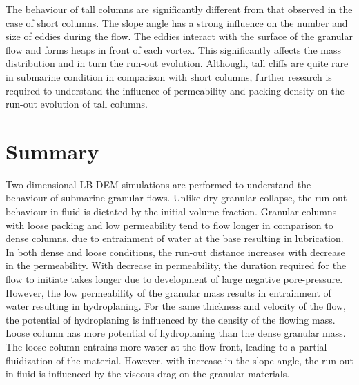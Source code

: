 The behaviour of tall columns are significantly different from that observed in 
the case of short columns. The slope angle has a strong influence on the number 
and size of eddies during the flow. The eddies interact with the surface of the 
granular flow and forms heaps in front of each vortex. This significantly 
affects the mass distribution and in turn the run-out evolution. Although, tall 
cliffs are quite rare in submarine condition in comparison with short columns, 
further research is required to understand the influence of permeability and 
packing density on the run-out evolution of tall columns. 

\section{Summary}

Two-dimensional LB-DEM simulations are performed to understand the behaviour 
of submarine granular flows. Unlike dry granular collapse, the run-out 
behaviour in fluid is dictated by the initial volume fraction. Granular columns 
with loose packing and low permeability tend to flow longer in comparison to 
dense columns, due to entrainment of water at the base resulting in 
lubrication. In both dense and loose conditions, the run-out distance increases 
with decrease in the permeability. With decrease in permeability, the duration 
required for the flow to initiate takes longer due to development of large 
negative pore-pressure. However, the low permeability of the granular mass 
results in entrainment of water resulting in hydroplaning. For the same 
thickness and velocity of the flow, the potential of hydroplaning is influenced 
by the density of the flowing mass. Loose column has more potential of 
hydroplaning than the dense granular mass. The loose column entrains more water 
at the flow front, leading to a partial fluidization of the material. However, 
with increase in the slope angle, the run-out in fluid is influenced by the 
viscous drag on the granular materials. 